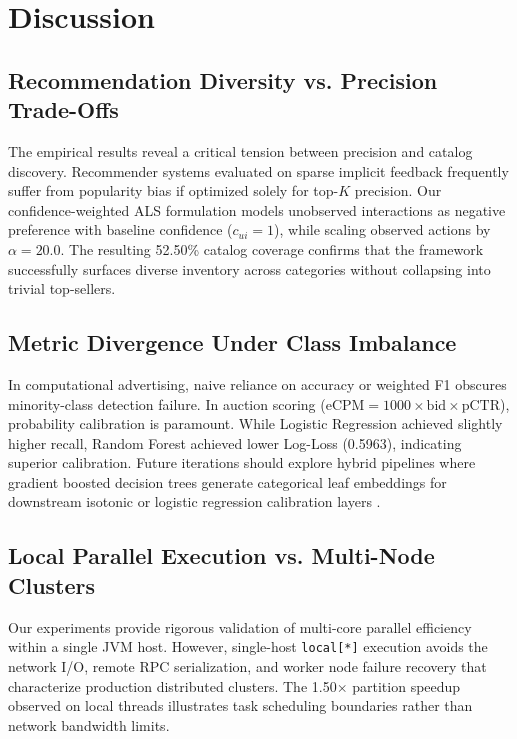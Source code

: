 \documentclass[10pt,a4paper,twoside]{article}
\begin{document}
\section{Discussion}

\subsection{Recommendation Diversity vs. Precision Trade-Offs}
The empirical results reveal a critical tension between precision and catalog discovery. Recommender systems evaluated on sparse implicit feedback frequently suffer from popularity bias if optimized solely for top-$K$ precision. Our confidence-weighted ALS formulation models unobserved interactions as negative preference with baseline confidence ($c_{ui} = 1$), while scaling observed actions by $\alpha = 20.0$. The resulting 52.50\% catalog coverage confirms that the framework successfully surfaces diverse inventory across categories without collapsing into trivial top-sellers.

\subsection{Metric Divergence Under Class Imbalance}
In computational advertising, naive reliance on accuracy or weighted F1 obscures minority-class detection failure. In auction scoring ($\text{eCPM} = 1000 \times \text{bid} \times \text{pCTR}$), probability calibration is paramount. While Logistic Regression achieved slightly higher recall, Random Forest achieved lower Log-Loss (0.5963), indicating superior calibration. Future iterations should explore hybrid pipelines where gradient boosted decision trees generate categorical leaf embeddings for downstream isotonic or logistic regression calibration layers \cite{he2014practical}.

\subsection{Local Parallel Execution vs. Multi-Node Clusters}
Our experiments provide rigorous validation of multi-core parallel efficiency within a single JVM host. However, single-host \texttt{local[*]} execution avoids the network I/O, remote RPC serialization, and worker node failure recovery that characterize production distributed clusters. The 1.50$\times$ partition speedup observed on local threads illustrates task scheduling boundaries rather than network bandwidth limits.
\end{document}
